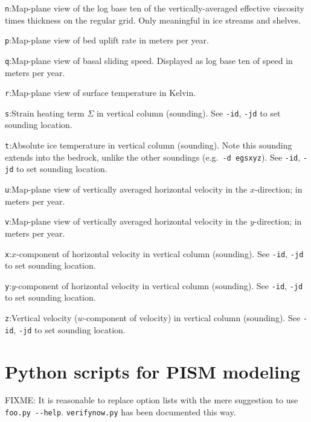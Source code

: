 \documentclass[11pt,final]{amsart}
\begin{document}

\verb|n|:\quad Map-plane view of the log base ten of the vertically-averaged effective viscosity times thickness on the regular grid.  Only meaningful in ice streams and shelves.

\verb|p|:\quad Map-plane view of bed uplift rate in meters per year.

\verb|q|:\quad Map-plane view of basal sliding speed.  Displayed as log base ten of speed in meters per year.

\verb|r|:\quad Map-plane view of surface temperature in Kelvin.

\verb|s|:\quad Strain heating term $\Sigma$ in vertical column (sounding).  See \verb|-id|, \verb|-jd| to set sounding location.

\verb|t|:\quad Absolute ice temperature in vertical column (sounding).  Note this sounding extends into the bedrock, unlike the other soundings (e.g.~\verb|-d egsxyz|).  See \verb|-id|, \verb|-jd| to set sounding location.

\verb|u|:\quad Map-plane view of vertically averaged horizontal velocity in the $x$-direction;  in meters per year.

\verb|v|:\quad Map-plane view of vertically averaged horizontal velocity in the $y$-direction;  in meters per year.

\verb|x|:\quad $x$-component of horizontal velocity in vertical column (sounding).  See \verb|-id|, \verb|-jd| to set sounding location.

\verb|y|:\quad $y$-component of horizontal velocity in vertical column (sounding).  See \verb|-id|, \verb|-jd| to set sounding location.

\verb|z|:\quad Vertical velocity ($w$-component of velocity) in vertical column (sounding).  See \verb|-id|, \verb|-jd| to set sounding location.



\clearpage \newpage
\section{Python scripts for PISM modeling}\label{sect:scripts}

FIXME:  It is reasonable to replace option lists with the mere suggestion to use \verb|foo.py --help|.  \verb|verifynow.py| has been documented this way.
\end{document}

